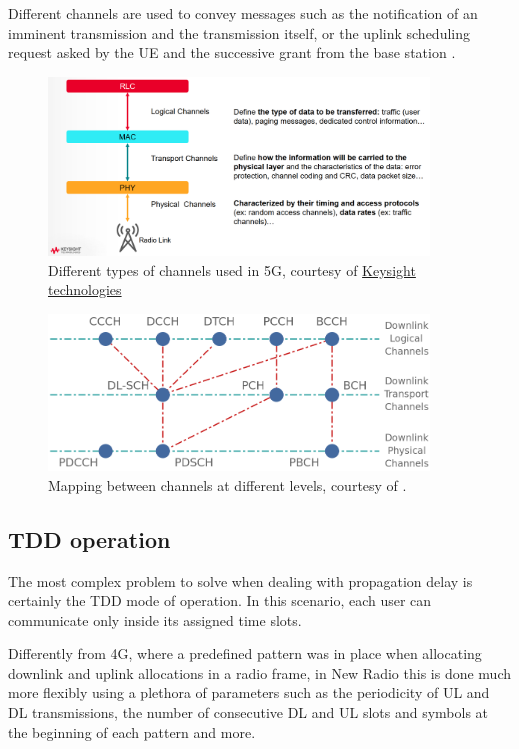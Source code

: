 Different channels are used to convey messages such as the notification of an imminent transmission and the transmission itself, or the uplink scheduling request asked by the \ac{UE} and the successive grant from the base station \cite{5g-mac-devopedia}.

\begin{figure}[ht]
    \centering
    \includegraphics[width=0.9\textwidth]{res/nr-types-channels.png}
    \caption{Different types of channels used in 5G, courtesy of \href{https://www.keysight.com/}{Keysight technologies}}
    \label{fig:nr-types-channels}
\end{figure}

\begin{figure}[ht]
    \centering
    \includegraphics[width=0.9\textwidth]{res/channels.png}
    \caption{Mapping between channels at different levels, courtesy of \cite{5g-ch-devopedia}.}
    \label{fig:nr-channel-mapping}
\end{figure}

\subsection{TDD operation}
The most complex problem to solve when dealing with propagation delay is certainly the \ac{TDD} mode of operation. In this scenario, each user can communicate only inside its assigned time slots.

Differently from 4G, where a predefined pattern was in place when allocating downlink and uplink allocations in a radio frame, in New Radio this is done much more flexibly using a plethora of parameters such as the periodicity of UL and DL transmissions, the number of consecutive DL and UL slots and symbols at the beginning of each pattern and more.

